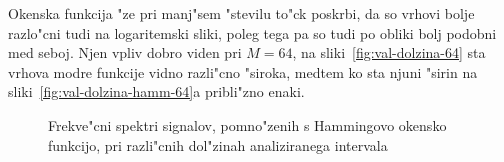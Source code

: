 \documentclass[a4paper,10pt]{article}
\begin{document}
Okenska funkcija "ze pri manj"sem "stevilu to"ck poskrbi, da so vrhovi bolje razlo"cni tudi na logaritemski sliki, poleg tega pa so tudi po obliki bolj podobni med seboj. Njen vpliv dobro viden pri $M=64$, na sliki~\ref{fig:val-dolzina-64} sta vrhova modre funkcije vidno razli"cno "siroka, medtem ko sta njuni "sirin na sliki~\ref{fig:val-dolzina-hamm-64}a pribli"zno enaki. 

\begin{figure}[h]
 \subfigure[$M = 64$]{\label{fig:val-dolzina-hamm-64}} 
 \subfigure[$M = 128$]{}
 \subfigure[$M = 256$]{}
 \subfigure[$M = 512$]{}
\caption{Frekve"cni spektri signalov, pomno"zenih s Hammingovo okensko funkcijo, pri razli"cnih dol"zinah analiziranega intervala}
\label{fig:val-dolzina-hamm}
\end{figure}
\end{document}
